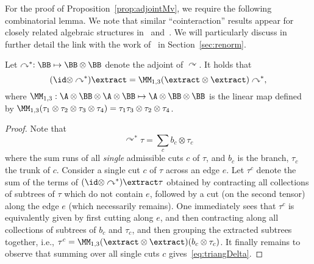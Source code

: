 \documentclass{article}
\begin{document}
For the proof of Proposition~\ref{prop:adjointMv}, we require the following combinatorial lemma. We note that similar ``cointeraction'' results appear for closely related algebraic structures in~\cite[Thm 8]{Calaque11}  and~\cite[Thm 5.37]{BHZ16}. We will particularly discuss in further detail the link with the work of~\cite{BHZ16} in Section~\ref{sec:renorm}.

\begin{lemma}\label{lem:adjointComm}
Let $\curvearrowright^*: \BB \mapsto \BB \otimes \BB$ denote the adjoint of $\curvearrowright$. It holds that
\begin{equation}\label{eq:triangDelta}
(\id \otimes \curvearrowright^*)\extract = \MM_{1,3}(\extract \otimes \extract)\curvearrowright^*,
\end{equation}
where $\MM_{1,3} : \A \otimes \BB \otimes \A \otimes \BB \mapsto \A \otimes \BB \otimes \BB$ is the linear map defined by ${\MM_{1,3}(\tau_1\otimes \tau_2\otimes\tau_3\otimes\tau_4)} = \tau_1\tau_3\otimes \tau_2\otimes\tau_4$.
\end{lemma}

\begin{proof}
Note that
\[
\curvearrowright^* \tau = \sum_{c} b_c \otimes \tau_c
\]
where the sum runs of all \emph{single} admissible cuts $c$ of $\tau$, and $b_c$ is the branch, $\tau_c$ the trunk of $c$.
Consider a single cut $c$ of $\tau$ across an edge $e$. Let $\tau^c$ denote the sum of the terms of $(\id \otimes \curvearrowright^*)\extract \tau$ obtained by contracting all collections 
of subtrees of $\tau$ which do not contain $e$, followed by a cut (on the second tensor) along the edge $e$ (which necessarily remains). One immediately sees that $\tau^c$ is 
equivalently given by first cutting along $e$, and then contracting along all collections of subtrees of $b_c$ and $\tau_c$, and then grouping the extracted subtrees together, i.e., $\tau^c 
= \MM_{1,3}(\extract \otimes \extract)(b_c\otimes \tau_c)$.
It finally remains to observe that summing over all single cuts $c$ gives~\eqref{eq:triangDelta}.
\end{proof}
\end{document}
